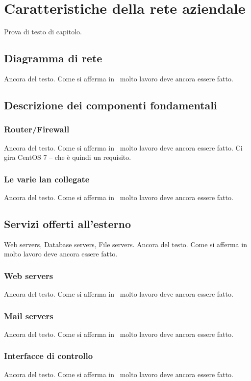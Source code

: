 \section{Caratteristiche della rete aziendale}

Prova di testo di capitolo.

\subsection{Diagramma di rete}

Ancora del testo. Come si afferma in~\cite{jones96analysis} molto lavoro deve ancora essere fatto.

\subsection{Descrizione dei componenti fondamentali}
\subsubsection{Router/Firewall}
Ancora del testo. Come si afferma in~\cite{jones96analysis} molto lavoro deve ancora essere fatto.
Ci gira CentOS 7 -- che è quindi un requisito.

\subsubsection{Le varie lan collegate}
Ancora del testo. Come si afferma in~\cite{jones96analysis} molto lavoro deve ancora essere fatto.


\subsection{Servizi offerti all'esterno}

Web servers, Database servers, File servers. Ancora del testo. Come si afferma in~\cite{jones96analysis} molto lavoro deve ancora essere fatto.
\subsubsection{Web servers}
Ancora del testo. Come si afferma in~\cite{jones96analysis} molto lavoro deve ancora essere fatto.
\subsubsection{Mail servers}
Ancora del testo. Come si afferma in~\cite{jones96analysis} molto lavoro deve ancora essere fatto.
\subsubsection{Interfacce di controllo}
Ancora del testo. Come si afferma in~\cite{jones96analysis} molto lavoro deve ancora essere fatto.

